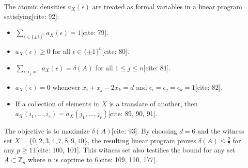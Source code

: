\documentclass{article}
\begin{document}
The atomic densities $a_{X}(\epsilon)$ are treated as formal variables in a linear program satisfying[cite: 92]:
\begin{itemize}
    \item $\sum_{\epsilon \in \{\pm 1\}^{n}} a_{X}(\epsilon) = 1$[cite: 79].
    \item $a_{X}(\epsilon) \ge 0$ for all $\epsilon \in \{\pm 1\}^{n}$[cite: 80].
    \item $\sum_{\epsilon:\epsilon_{j}=1} a_{X}(\epsilon) = \delta(A)$ for all $1 \le j \le n$[cite: 81].
    \item $a_{X}(\epsilon) = 0$ whenever $x_{i} + x_{j} - 2x_{k} = d$ and $\epsilon_{i} = \epsilon_{j} = \epsilon_{k} = 1$[cite: 82].
    \item If a collection of elements in $X$ is a translate of another, then $\overline{a}_{X}(i_{1}, \dots, i_{r}) = \overline{a}_{X}(j_{1}, \dots, j_{r})$[cite: 89, 90, 91].
\end{itemize}

The objective is to maximize $\delta(A)$[cite: 93]. By choosing $d = 6$ and the witness set $X = \{0, 2, 3, 4, 7, 8, 9, 10\}$, the resulting linear program proves $\delta(A) \le \frac{2}{7}$ for any $p \ge 11$[cite: 100, 101]. This witness set also testifies the bound for any set $A \subset \mathbb{Z}_{n}$ where $n$ is coprime to 6[cite: 109, 110, 177].
\end{document}
